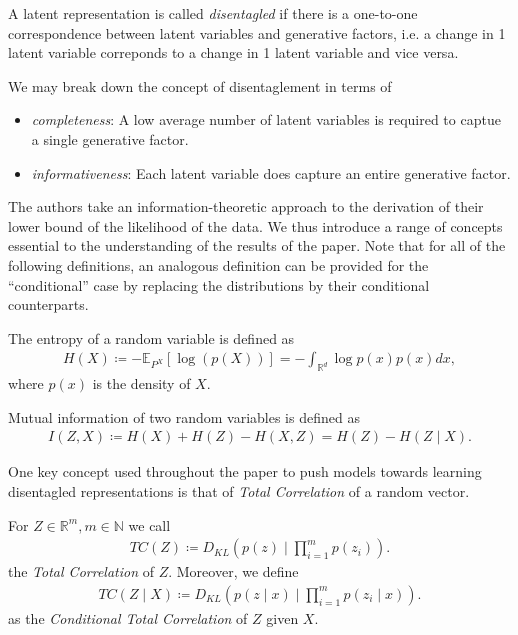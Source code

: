 \documentclass[twoside,11pt]{article}
\newcommand{\N}{\mathbb{N}}
\newcommand{\R}{\mathbb{R}}
\begin{document}
\begin{definition}
  A latent representation is called \textit{disentagled} if there is a one-to-one correspondence between latent variables and generative factors, i.e. a change in 1 latent variable correponds to a change in 1 latent variable and vice versa.
\end{definition}
We may break down the concept of disentaglement in terms of
\begin{itemize}
  \item \textit{completeness}: A low average number of latent variables is required to captue a single generative factor.
  \item \textit{informativeness}: Each latent variable does capture an entire generative factor.
\end{itemize}
The authors take an information-theoretic approach to the derivation of their lower bound of the likelihood of the data. We thus introduce a range of concepts essential to the understanding of the results of the paper. Note that for all of the following definitions, an analogous definition can be provided for the \enquote{conditional} case by replacing the distributions by their conditional counterparts.

\begin{definition}
  The entropy of a random variable is defined as
  \begin{align*}
    H(X) \coloneqq - \mathbb{E}_{P^{X}}[\log(p(X))] = - \int_{\R^{d}}\log p(x)p(x) dx,
  \end{align*}
  where $p(x)$ is the density of $X$.
\end{definition}

\begin{definition}
  Mutual information of two random variables is defined as
  \begin{align*}
    I(Z, X) \coloneqq H(X) + H(Z) - H(X, Z) = H(Z) - H(Z \mid X).
  \end{align*}
\end{definition}

One key concept used throughout the paper to push models towards learning disentagled representations is that of \textit{Total Correlation} of a random vector.

\begin{definition}
  For $Z \in \R^{m}, m \in \N$ we call
  \begin{align*}
    TC(Z) \coloneqq D_{KL}(p(z) \mid \prod_{i=1}^{m}p(z_{i})).
  \end{align*}
  the \textit{Total Correlation} of $Z$. Moreover, we define
  \begin{align*}
    TC(Z \mid X) \coloneqq D_{KL}(p(z \mid x) \mid \prod_{i=1}^{m}p(z_{i} \mid x)).
  \end{align*}
  as the \textit{Conditional Total Correlation} of $Z$ given $X$.
\end{definition}
\end{document}
